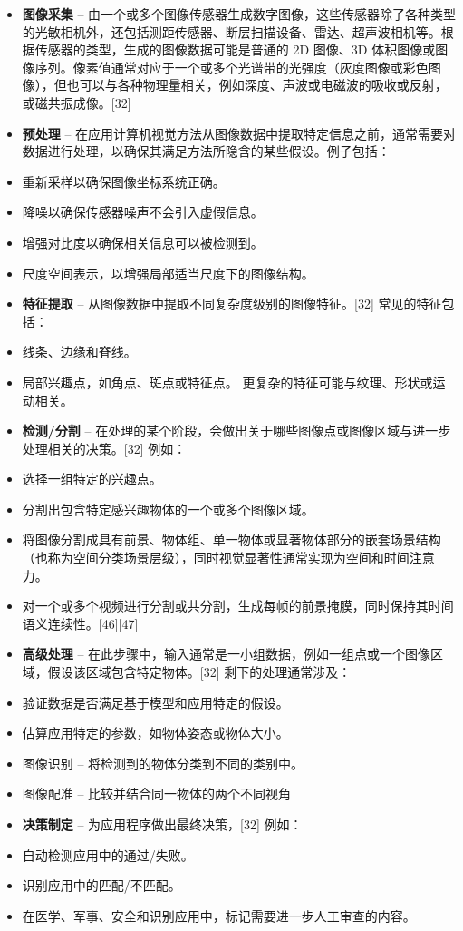 \begin{itemize}
\item \textbf{图像采集} – 由一个或多个图像传感器生成数字图像，这些传感器除了各种类型的光敏相机外，还包括测距传感器、断层扫描设备、雷达、超声波相机等。根据传感器的类型，生成的图像数据可能是普通的 2D 图像、3D 体积图像或图像序列。像素值通常对应于一个或多个光谱带的光强度（灰度图像或彩色图像），但也可以与各种物理量相关，例如深度、声波或电磁波的吸收或反射，或磁共振成像。[32]  
\item \textbf{预处理} – 在应用计算机视觉方法从图像数据中提取特定信息之前，通常需要对数据进行处理，以确保其满足方法所隐含的某些假设。例子包括：  
\item 重新采样以确保图像坐标系统正确。  
\item 降噪以确保传感器噪声不会引入虚假信息。  
\item 增强对比度以确保相关信息可以被检测到。  
\item 尺度空间表示，以增强局部适当尺度下的图像结构。
\item \textbf{特征提取} – 从图像数据中提取不同复杂度级别的图像特征。[32] 常见的特征包括：  
\item 线条、边缘和脊线。  
\item 局部兴趣点，如角点、斑点或特征点。  
更复杂的特征可能与纹理、形状或运动相关。 
\item \textbf{检测/分割} – 在处理的某个阶段，会做出关于哪些图像点或图像区域与进一步处理相关的决策。[32] 例如：  
\item 选择一组特定的兴趣点。  
\item 分割出包含特定感兴趣物体的一个或多个图像区域。  
\item 将图像分割成具有前景、物体组、单一物体或显著物体部分的嵌套场景结构（也称为空间分类场景层级），同时视觉显著性通常实现为空间和时间注意力。  
\item 对一个或多个视频进行分割或共分割，生成每帧的前景掩膜，同时保持其时间语义连续性。[46][47]  
\item \textbf{高级处理} – 在此步骤中，输入通常是一小组数据，例如一组点或一个图像区域，假设该区域包含特定物体。[32] 剩下的处理通常涉及：  
\item 验证数据是否满足基于模型和应用特定的假设。  
\item 估算应用特定的参数，如物体姿态或物体大小。  
\item 图像识别 – 将检测到的物体分类到不同的类别中。  
\item 图像配准 – 比较并结合同一物体的两个不同视角
\item \textbf{决策制定} – 为应用程序做出最终决策，[32] 例如：  
\item 自动检测应用中的通过/失败。  
\item 识别应用中的匹配/不匹配。  
\item 在医学、军事、安全和识别应用中，标记需要进一步人工审查的内容。
\end{itemize}
